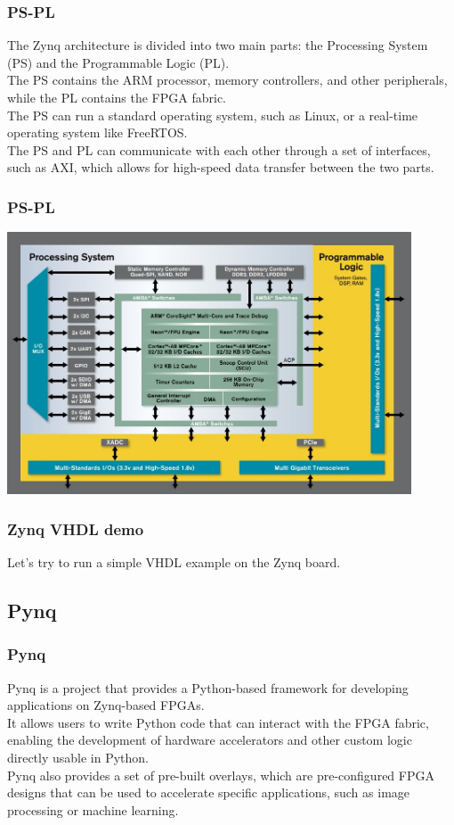 \documentclass{beamer}
\begin{document}
\begin{frame}\frametitle{PS-PL}
The Zynq architecture is divided into two main parts:
 the Processing System (PS) and the Programmable Logic 
 (PL). \\
\vspace{0.7cm}
The PS contains the ARM processor, memory controllers,
and other peripherals, while the PL contains the FPGA fabric. \\
\vspace{0.7cm}
The PS can run a standard operating system, such as Linux,
or a real-time operating system like FreeRTOS. \\
\vspace{0.7cm}
The PS and PL can communicate with each other through a set of
interfaces, such as AXI, which allows for high-speed data transfer
between the two parts. \\
\end{frame}

\begin{frame}\frametitle{PS-PL}
\centering
\includegraphics[width=0.9\textwidth]{zynq-pl-ps.jpg}
\end{frame}

\begin{frame}\frametitle{Zynq VHDL demo}
\centering
Let's try to run a simple VHDL example on the Zynq board. 
\end{frame}

\subsection{Pynq}

\begin{frame}\frametitle{Pynq}
Pynq is a project that provides a Python-based framework
for developing applications on Zynq-based FPGAs. \\
\vspace{0.5cm}
It allows users to write Python code that can interact 
with the FPGA fabric, enabling the development of 
hardware accelerators and other custom logic directly
usable in Python. \\
\vspace{0.5cm}
Pynq also provides a set of pre-built overlays,
which are pre-configured FPGA designs that can be used
to accelerate specific applications, such as image
processing or machine learning. \\
\end{frame}
\end{document}
